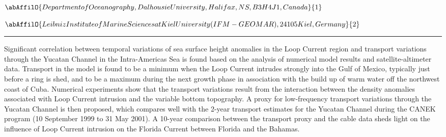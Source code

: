 \begin{minipage}{\linewidth}\begin{center}\begin{minipage}{\linewidth}
   \vspace{2 mm} \begin{center}
    \vspace{2 mm}\begin{center}
  
  $\abAffilO{Department of Oceanography, Dalhousie University, Halifax, NS, B3H 4J1, Canada}{1}$

  
  $\abAffilO{Leibniz Institute of Marine Sciences at Kiel University (IFM-GEOMAR), 24105 Kiel, Germany}{2}$

  \end{center}
  \vspace{2 mm}
  \end{center}\end{minipage}\end{center}
  \begin{center}\rule{0.70\linewidth}{0.5 pt}\end{center}
  \begin{minipage}{\linewidth}
\noindent Significant correlation between temporal variations of sea surface height anomalies in the Loop Current region and transport variations through the Yucatan Channel in the Intra-Americas Sea is found based on the analysis of numerical model results and satellite-altimeter data. Transport in the model is found to be a minimum when the Loop Current intrudes strongly into the Gulf of Mexico, typically just before a ring is shed, and to be a maximum during the next growth phase in association with the build up of warm water off the northwest coast of Cuba. Numerical experiments show that the transport variations result from the interaction between the density anomalies associated with Loop Current intrusion and the variable bottom topography. A proxy for low-frequency transport variations through the Yucatan Channel is then proposed, which compares well with the 2-year transport estimates for the Yucatan Channel during the CANEK program (10 September 1999 to 31 May 2001). A 10-year comparison between the transport proxy and the cable data sheds light on the influence of Loop Current intrusion on the Florida Current between Florida and the Bahamas.
\end{minipage}\end{minipage}

